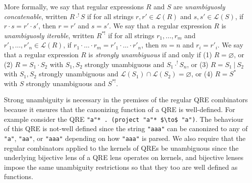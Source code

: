 \documentclass[acmsmall,review,anonymous]{acmart}
\newcommand{\sep}{\ensuremath{\ | \ }}
\newcommand{\cd}[1]{\lstinline[backgroundcolor=\color{white}]$#1$}
\begin{document}
More formally, we say that regular expressions $R$ and $S$ are
\textit{unambiguosly concatenable}, written $R \cdot^! S$ if for all strings
$r, r' \in \mathcal{L}(R)$ and $s, s' \in \mathcal{L}(S)$, if $r \cdot s = r'
\cdot s'$, then $r = r'$ and $s = s'$. We say that a regular expression $R$ is
\textit{unambiguosly iterable}, written $R^{*!}$ if for all strings $r_1,
\ldots, r_m$ and $r'_1, \ldots, r'_n \in \mathcal{L}(R)$, if $r_1 \cdot \ldots
\cdot r_m = r'_1 \cdot \ldots \cdot r'_n$, then $m = n$ and $r_i = r'_i$. We say
that a regular expression $R$ is \textit{strongly unambiguous}\cite{Sippu1988}
if and only if (1) $R = \varnothing$, or (2) $R = S_1 \cdot S_2$ with $S_1,
S_2$ strongly unambiguous and $S_1 \cdot^! S_n$, or (3) $R = S_1 \sep S_2$ with
$S_1, S_2$ strongly unambiguous and $\mathcal{L}(S_1) \cap \mathcal{L}(S_2) =
\varnothing$, or (4) $R = S^*$ with $S$ strongly unambiguous and $S^{*!}$.

Strong unambiguity is necessary in the premises of the regular QRE combinators
because it ensures that the canonizing function of a QRE is well-defined.
For example consider the QRE \lstinline{"a"* . (project "a"* $\to$ "a")}. The
behaviour of this QRE is not-well defined since the string
\cd{"aaa"} can be canonized to any of \cd{"a"}, \cd{"aa"}, or \cd{"aaa"}
depending on how \cd{"aaa"} is parsed. We also require that the regular
combinators applied to the kernels of QREs be unambiguous since the underlying
bijective lens of a QRE lens operates on kernels, and bijective lenses
impose the same unambiguity restrictions so that they too are well defined as
functions.
\end{document}
